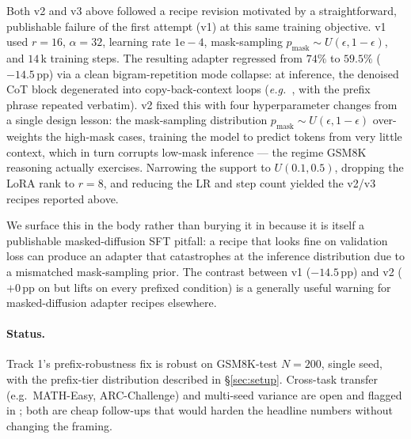Both v2 and v3 above followed a recipe revision motivated by a
straightforward, publishable failure of the first attempt (v1) at
this same training objective.  v1 used $r{=}16$, $\alpha{=}32$,
learning rate $1\mathrm{e}{-}4$, mask-sampling
$p_{\text{mask}} \sim U(\epsilon, 1{-}\epsilon)$, and $14$\,k
training steps.  The resulting adapter regressed \ctwo{} from
$74\%$ to $59.5\%$ ($-14.5$\,pp) via a clean bigram-repetition
mode collapse: at inference, the denoised CoT block degenerated
into copy-back-context loops (\textit{e.g.\ }, with the prefix
phrase repeated verbatim).  v2 fixed this with four
hyperparameter changes from a single design lesson: the
mask-sampling distribution
$p_{\text{mask}} \sim U(\epsilon, 1{-}\epsilon)$ over-weights the
high-mask cases, training the model to predict tokens from very
little context, which in turn corrupts low-mask inference --- the
regime GSM8K reasoning actually exercises.  Narrowing the support
to $U(0.1, 0.5)$, dropping the LoRA rank to $r{=}8$, and reducing
the LR and step count yielded the v2/v3 recipes reported above.

We surface this in the body rather than burying it in
 because it is itself a
publishable masked-diffusion SFT pitfall: a recipe that looks
fine on validation loss can produce an adapter that catastrophes
at the inference distribution due to a mismatched mask-sampling
prior.  The contrast between v1 ($-14.5$\,pp) and v2 ($+0$\,pp on
\ctwo{} but lifts on every prefixed condition) is a generally
useful warning for masked-diffusion adapter recipes elsewhere.

\paragraph{Status.}
Track 1's prefix-robustness fix is robust on GSM8K-test
$N{=}200$, single seed, with the prefix-tier distribution
described in \S\ref{sec:setup}.  Cross-task transfer (e.g.\
MATH-Easy, ARC-Challenge) and multi-seed variance are open and
flagged in ; both are cheap follow-ups that
would harden the headline numbers without changing the framing.
